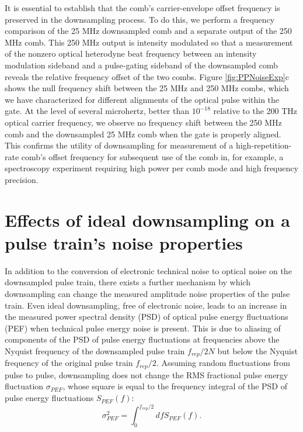 It is essential to establish that the comb's carrier-envelope offset frequency is preserved in the downsampling process. To do this, we perform a frequency comparison of the 25 MHz downsampled comb and a separate output of the 250 MHz comb. This 250 MHz output is intensity modulated so that a measurement of the nonzero optical heterodyne beat frequency between an intensity modulation sideband and a pulse-gating sideband of the downsampled comb reveals the relative frequency offset of the two combs. Figure \ref{fig:PPNoiseExp}c shows the null frequency shift between the 25 MHz and 250 MHz combs, which we have characterized for different alignments of the optical pulse within the gate. At the level of several microhertz, better than $10^{-18}$ relative to the 200 THz optical carrier frequency, we observe no frequency shift between the 250 MHz comb and the downsampled 25 MHz comb when the gate is properly aligned. This confirms the utility of downsampling for measurement of a high-repetition-rate comb's offset frequency for subsequent use of the comb in, for example, a spectroscopy experiment requiring high power per comb mode and high frequency precision.

\section{Effects of ideal downsampling on a pulse train's noise properties}\label{sec:PPNoiseTheory}

In addition to the conversion of electronic technical noise to optical noise on the downsampled pulse train, there exists a further mechanism by which downsampling can change the measured amplitude noise properties of the pulse train. Even ideal downsampling, free of electronic noise, leads to an increase in the measured power spectral density (PSD) of optical pulse energy fluctuations (PEF) when technical pulse energy noise is present. This is due to aliasing of components of the PSD of pulse energy fluctuations at frequencies above the Nyquist frequency of the downsampled pulse train $f_{rep}/2N$ but below the Nyquist frequency of the original pulse train $f_{rep}/2$. Assuming random fluctuations from pulse to pulse, downsampling does not change the RMS fractional pulse energy fluctuation $\sigma_{PEF}$, whose square is equal to the frequency integral of the PSD of pulse energy fluctuations $S_{PEF} (f)$:
\begin{equation}
\sigma_{PEF}^2=\int_{0}^{f_{rep}/2}df S_{PEF} (f).         
\end{equation}
                       
